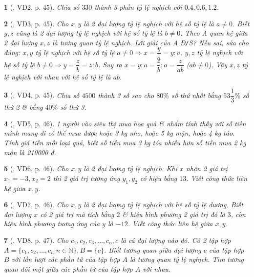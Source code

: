 \documentclass{article}
\newtheorem{baitoan}{}
\begin{document}
\begin{baitoan}[\cite{Binh_boi_duong_Toan_7_tap_1}, VD2, p. 45]
	Chia số $330$ thành 3 phần tỷ lệ nghịch với $0.4,0.6,1.2$.
\end{baitoan}

\begin{baitoan}[\cite{Binh_boi_duong_Toan_7_tap_1}, VD3, p. 45]
	Cho $x,y$ là 2 đại lượng tỷ lệ nghịch với hệ số tỷ lệ là $a\ne0$. Biết $y,z$ cũng là 2 đại lượng tỷ lệ nghịch với hệ số tỷ lệ là $b\ne0$. Theo A quan hệ giữa 2 đại lượng $x,z$ là tương quan tỷ lệ nghịch. Lời giải của A {\rm Đ{\tt/}S?} Nếu sai, sửa cho đúng: $x,y$ tỷ lệ nghịch với hệ số tỷ lệ $a\ne0\Rightarrow x = \dfrac{y}{a} = y:a$. $y,z$ tỷ lệ nghịch với hệ số tỷ lệ $b\ne0\Rightarrow y = \dfrac{z}{b} = z:b$. Suy ra $x = y:a = \dfrac{z}{b}:a = \dfrac{z}{ab}$ ($ab\ne0$). Vậy $x,z$ tỷ lệ nghịch với nhau với hệ số tỷ lệ là $ab$.
\end{baitoan}

\begin{baitoan}[\cite{Binh_boi_duong_Toan_7_tap_1}, VD4, p. 45]
	Chia số $4500$ thành 3 số sao cho $80\%$ số thứ nhất bằng $53\dfrac{1}{3}\%$ số thứ 2 \& bằng $40\%$ số thứ 3.
\end{baitoan}

\begin{baitoan}[\cite{Binh_boi_duong_Toan_7_tap_1}, VD5, p. 46]
	1 người vào siêu thị mua hoa quả \& nhẩm tính thấy với số tiền mình mang đi có thể mua được hoặc {\rm3 kg} nho, hoặc {\rm5 kg} mận, hoặc {\rm4 kg} táo. Tính giá tiền mỗi loại quả, biết số tiền mua {\rm3 kg} tóa nhiều hơn số tiền mua {\rm2 kg} mận là {\rm210000 đ}.
\end{baitoan}

\begin{baitoan}[\cite{Binh_boi_duong_Toan_7_tap_1}, VD6, p. 46]
	Cho $x,y$ là 2 đại lượng tỷ lệ nghịch. Khi $x$ nhận 2 giá trị $x_1 = -3,x_2 = 2$ thì 2 giá trị tương ứng $y_1,y_2$ có hiệu bằng $13$. Viết công thức liên hệ giữa $x,y$.
\end{baitoan}

\begin{baitoan}[\cite{Binh_boi_duong_Toan_7_tap_1}, VD7, p. 46]
	Cho $x,y$ là 2 đại lượng tỷ lệ nghịch với hệ số tỷ lệ dương. Biết đại lượng $x$ có 2 giá trị mà tích bằng $2$ \& hiệu bình phương 2 giá trị đó là $3$, còn hiệu bình phương tương ứng của $y$ là $-12$. Viết công thức liên hệ giữa $x,y$.
\end{baitoan}

\begin{baitoan}[\cite{Binh_boi_duong_Toan_7_tap_1}, VD8, p. 47]
	Cho $c_1,c_2,c_3,\ldots,c_n,c$ là cá đại lượng nào đó. Có 2 tập hợp $A = \{c_1,c_2,\ldots,c_n|n\in\mathbb{N}\},B = \{c\}$. Biết tương quan giữa đại lượng $c$ của tập hợp $B$ với lần lượt các phần tử của tập hợp $A$ là tương quan tỷ lệ nghịch. Tìm tương quan đôi một giữa các phần tử của tập hợp $A$ với nhau.
\end{baitoan}
\end{document}
